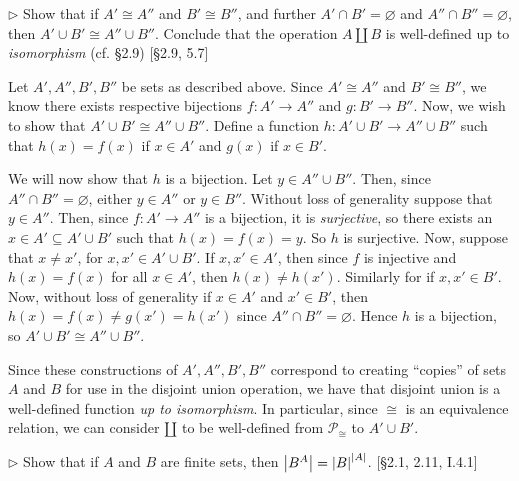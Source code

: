 \hypertarget{Exercise I.2.9}{}
\begin{problem}[2.9]
	$\rhd$ Show that if $A'\cong A''$ and $B'\cong B''$, and further
	$A'\cap B'=\varnothing$ and $A''\cap B''=\varnothing$, then $A'\cup B'\cong A''\cup
	B''$. Conclude that the operation $A\amalg B$ is well-defined up to
	\textit{isomorphism} (cf. \S2.9) [\S2.9, 5.7]
\end{problem}

\begin{solution}
	Let $A',A'',B',B''$ be sets as described above. Since $A'\cong A''$ and $B'\cong
	B''$, we know there exists respective bijections $f:A'\to A''$ and $g:B'\to
	B''$. Now, we wish to show that $A'\cup B'\cong A''\cup B''$. Define a function
	$h:A'\cup B'\to A''\cup B''$ such that $h(x) = f(x)$ if $x\in A'$ and $g(x)$ if
	$x\in B'$.
	
	We will now show that $h$ is a bijection. Let $y\in A''\cup B''$. Then, since
	$A''\cap B''=\varnothing$, either $y\in A''$ or $y\in B''$. Without loss of
	generality suppose that $y\in A''$. Then, since $f:A'\to A''$ is a bijection, it
	is \textit{surjective}, so there exists an $x\in A'\subseteq A'\cup B'$ such
	that $h(x) = f(x) = y$. So $h$ is surjective. Now, suppose that $x\neq x'$, for
	$x,x'\in A'\cup B'$. If $x,x'\in A'$, then since $f$ is injective and $h(x) =
	f(x)$ for all $x\in A'$, then $h(x)\neq h(x')$. Similarly for if $x,x'\in B'$.
	Now, without loss of generality if $x\in A'$ and $x'\in B'$, then $h(x) = f(x)
	\neq g(x') = h(x')$ since $A''\cap B''=\varnothing$. Hence $h$ is a bijection, so
	$A'\cup B'\cong A''\cup B''$.
	
	Since these constructions of $A',A'',B',B''$ correspond to creating ``copies''
	of sets $A$ and $B$ for use in the disjoint union operation, we have that
	disjoint union is a well-defined function \textit{up to isomorphism}. In
	particular, since $\cong$ is an equivalence relation, we can consider $\amalg$
	to be well-defined from $\mathscr{P}_{\cong}$ to $A'\cup B'$.
\end{solution}


\hypertarget{Exercise I.2.10}{}
\begin{problem}[2.10]
	$\rhd$ Show that if $A$ and $B$ are finite sets, then $\left|B^A\right| =
	\left|B\right|^{\left|A\right|}$. [\S2.1, 2.11, I.4.1]
\end{problem}

